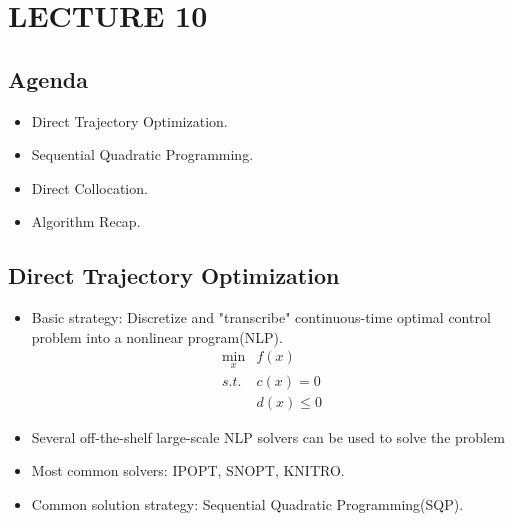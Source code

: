 \newpage
\section{LECTURE 10}

\subsection{Agenda}
\begin{itemize}
    \item Direct Trajectory Optimization.
    \item Sequential Quadratic Programming.
    \item Direct Collocation.
    \item Algorithm Recap.
\end{itemize}

\subsection{Direct Trajectory Optimization}
\begin{itemize}
    \item Basic strategy: Discretize and "transcribe" continuous-time optimal control problem into a nonlinear program(NLP).
    \begin{align}
        \min_x & f(x) \\
        s.t. & c(x) = 0 \\
        & d(x) \leq 0
    \end{align}
    \item Several off-the-shelf large-scale NLP solvers can be used to solve the problem
    \item Most common solvers: IPOPT, SNOPT, KNITRO.
    \item Common solution strategy: Sequential Quadratic Programming(SQP).
\end{itemize}

